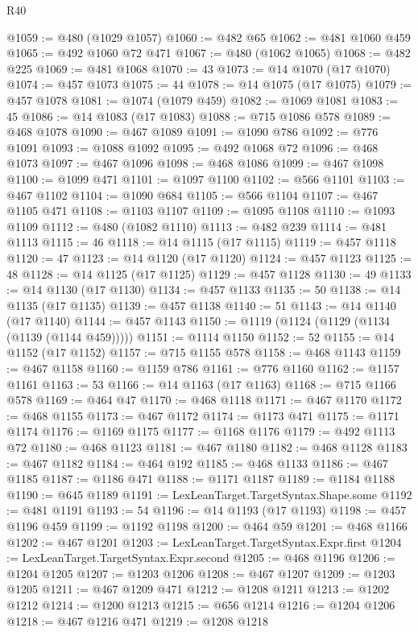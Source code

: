 \begin{lexlean}{R40}
\begin{coremodule}
@1059 := @480 (@1029 @1057)
@1060 := @482 @65
@1062 := @481 @1060 @459
@1065 := @492 @1060 @72 @471
@1067 := @480 (@1062 @1065)
@1068 := @482 @225
@1069 := @481 @1068
@1070 := 43
@1073 := @14 @1070 (@17 @1070)
@1074 := @457 @1073
@1075 := 44
@1078 := @14 @1075 (@17 @1075)
@1079 := @457 @1078
@1081 := @1074 (@1079 @459)
@1082 := @1069 @1081
@1083 := 45
@1086 := @14 @1083 (@17 @1083)
@1088 := @715 @1086 @578
@1089 := @468 @1078
@1090 := @467 @1089
@1091 := @1090 @786
@1092 := @776 @1091
@1093 := @1088 @1092
@1095 := @492 @1068 @72
@1096 := @468 @1073
@1097 := @467 @1096
@1098 := @468 @1086
@1099 := @467 @1098
@1100 := @1099 @471
@1101 := @1097 @1100
@1102 := @566 @1101
@1103 := @467 @1102
@1104 := @1090 @684
@1105 := @566 @1104
@1107 := @467 @1105 @471
@1108 := @1103 @1107
@1109 := @1095 @1108
@1110 := @1093 @1109
@1112 := @480 (@1082 @1110)
@1113 := @482 @239
@1114 := @481 @1113
@1115 := 46
@1118 := @14 @1115 (@17 @1115)
@1119 := @457 @1118
@1120 := 47
@1123 := @14 @1120 (@17 @1120)
@1124 := @457 @1123
@1125 := 48
@1128 := @14 @1125 (@17 @1125)
@1129 := @457 @1128
@1130 := 49
@1133 := @14 @1130 (@17 @1130)
@1134 := @457 @1133
@1135 := 50
@1138 := @14 @1135 (@17 @1135)
@1139 := @457 @1138
@1140 := 51
@1143 := @14 @1140 (@17 @1140)
@1144 := @457 @1143
@1150 := @1119 (@1124 (@1129 (@1134 (@1139 (@1144 @459)))))
@1151 := @1114 @1150
@1152 := 52
@1155 := @14 @1152 (@17 @1152)
@1157 := @715 @1155 @578
@1158 := @468 @1143
@1159 := @467 @1158
@1160 := @1159 @786
@1161 := @776 @1160
@1162 := @1157 @1161
@1163 := 53
@1166 := @14 @1163 (@17 @1163)
@1168 := @715 @1166 @578
@1169 := @464 @47
@1170 := @468 @1118
@1171 := @467 @1170
@1172 := @468 @1155
@1173 := @467 @1172
@1174 := @1173 @471
@1175 := @1171 @1174
@1176 := @1169 @1175
@1177 := @1168 @1176
@1179 := @492 @1113 @72
@1180 := @468 @1123
@1181 := @467 @1180
@1182 := @468 @1128
@1183 := @467 @1182
@1184 := @464 @192
@1185 := @468 @1133
@1186 := @467 @1185
@1187 := @1186 @471
@1188 := @1171 @1187
@1189 := @1184 @1188
@1190 := @645 @1189
@1191 := LexLeanTarget.TargetSyntax.Shape.some
@1192 := @481 @1191
@1193 := 54
@1196 := @14 @1193 (@17 @1193)
@1198 := @457 @1196 @459
@1199 := @1192 @1198
@1200 := @464 @59
@1201 := @468 @1166
@1202 := @467 @1201
@1203 := LexLeanTarget.TargetSyntax.Expr.first
@1204 := LexLeanTarget.TargetSyntax.Expr.second
@1205 := @468 @1196
@1206 := @1204 @1205
@1207 := @1203 @1206
@1208 := @467 @1207
@1209 := @1203 @1205
@1211 := @467 @1209 @471
@1212 := @1208 @1211
@1213 := @1202 @1212
@1214 := @1200 @1213
@1215 := @656 @1214
@1216 := @1204 @1206
@1218 := @467 @1216 @471
@1219 := @1208 @1218

\end{coremodule}
\end{lexlean}
